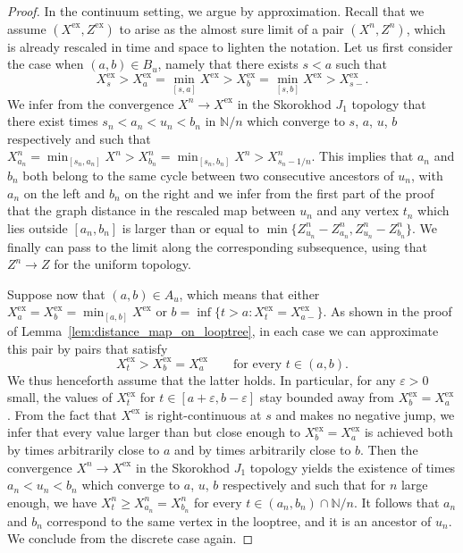 \documentclass[british, a4paper,11pt]{article}
\numberwithin{equation}{section}
\theoremstyle{definition}
\newcommand{\N}{\mathbb{N}}
\newcommand{\exc}{\mathrm{ex}}
\begin{document}
\begin{proof}
In the continuum setting, we argue by approximation. Recall that we assume $(X^{\exc}, Z^{\exc})$ to arise as the almost sure limit of a pair $(X^n, Z^n)$, which is already rescaled in time and space to lighten the notation.
Let us first consider the case when $(a,b) \in B_u$, namely that there exists $s<a$ such that
\[X^{\exc}_{s} > X^{\exc}_a = \min_{[s,a]} X^{\exc} > X^{\exc}_b = \min_{[s,b]} X^{\exc} > X^{\exc}_{s-}.\]
We infer from the convergence $X^n \to X^{\exc}$ in the Skorokhod $J_{1}$ topology that there exist times $s_n < a_n < u_n < b_n$ in $\N/n$ which converge to $s$, $a$, $u$, $b$ respectively and such that 
$X^n_{a_n} = \min_{[s_n,a_n]} X^n > X^n_{b_n} = \min_{[s_n,b_n]} X^n > X^n_{s_n-1/n}$.
This implies that $a_n$ and $b_n$ both belong to the same cycle between two consecutive ancestors of $u_n$, with $a_n$ on the left and $b_n$ on the right and we infer from the first part of the proof that the graph distance in the rescaled map between $u_n$ and any vertex $t_n$ which lies outside $[a_n, b_n]$ is larger than or equal to $\min\{Z^n_{u_n}-Z^n_{a_n}, Z^n_{u_n}-Z^n_{b_n}\}$. We finally can pass to the limit along the corresponding subsequence, using that $Z^n \to Z$ for the uniform topology.

Suppose now that $(a,b) \in A_u$, which means that either
$X^{\exc}_a = X^{\exc}_b = \min_{[a,b]} X^{\exc}$
or
$b = \inf\{t > a \colon X^{\exc}_t = X^{\exc}_{a-}\}$.
As shown in the proof of Lemma~\ref{lem:distance_map_on_looptree}, in each case we can approximate this pair by pairs that satisfy
\[X^{\exc}_t > X^{\exc}_b=X^{\exc}_a \qquad\text{for every } t \in (a,b).\]
We thus henceforth assume that the latter holds.
In particular, for any $\varepsilon > 0$ small, the values of $X^{\exc}_t$ for $t \in[a+\varepsilon, b-\varepsilon]$ stay bounded away from $X^{\exc}_b=X^{\exc}_a$.
From the fact that $X^{\exc}$ is right-continuous at $s$ and makes no negative jump, we infer that every value larger than but close enough to $X^{\exc}_b=X^{\exc}_a$ is achieved both by times arbitrarily close to $a$ and by times arbitrarily close to $b$.
Then the convergence $X^n \to X^{\exc}$ in the Skorokhod $J_{1}$ topology yields the existence of times $a_n < u_n < b_n$ which converge to $a$, $u$, $b$ respectively and such that for $n$ large enough, we have $X^n_t \ge X^n_{a_n} = X^n_{b_n}$ for every $t \in (a_n,b_n) \cap \N/n$.
It follows that $a_n$ and $b_n$ correspond to the same vertex in the looptree, and it is an ancestor of $u_n$.
We conclude from the discrete case again.
\end{proof}
\end{document}
